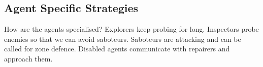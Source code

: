 \subsection{Agent Specific Strategies}
How are the agents specialised? Explorers keep probing for long. Inspectors probe enemies so that we can avoid saboteurs. Saboteurs are attacking and can be called for zone defence. Disabled agents communicate with repairers and approach them.
